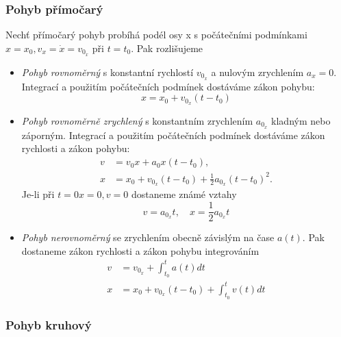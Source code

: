       \subsubsection{Pohyb přímočarý}
          Nechť přímočarý pohyb probíhá podél osy x s počátečními podmínkami $x = x_0,v_x =
          \dot{x}=v_{0_x}$ při $t = t_0$. Pak rozlišujeme
          \begin{itemize}
            \item \emph{Pohyb rovnoměrný} s konstantní rychlostí $v_{0_x}$ a nulovým zrychlením
                  $a_x=0$. Integrací a použitím počátečních podmínek dostáváme zákon pohybu:
                  \begin{equation}\label{mech:eq_primocar_rovnomer}
                    x=x_0+v_{0_x}(t-t_0)
                  \end{equation}
            \item \emph{Pohyb rovnoměrně zrychlený} s konstantním zrychlením $a_{0_x}$ kladným nebo
                  záporným. Integrací a použitím počátečních podmínek dostáváme zákon ry\-chlo\-sti a
                  zákon pohybu:
                  \begin{align}
                    v &= v_0x+a_0x(t-t_0), \\
                    x &= x_0+v_{0_x}(t-t_0)+\frac{1}{2}a_{0_x}(t-t_0)^2 \label{mech:eq_const_acc}.
                  \end{align}
                  Je-li při $t = 0 x = 0, v = 0$ dostaneme známé vztahy $$v=a_{0_x}t,\quad
                  x=\frac{1}{2}a_{0_x}t$$
            \item \emph{Pohyb nerovnoměrný} se zrychlením obecně závislým na čase $a(t)$. Pak
                  do\-sta\-ne\-me zákon rychlosti a zákon pohybu integrováním
                  \begin{align}
                    v &= v_{0_x}+\int_{t_0}^{t}{a(t)dt} \\
                    x &= x_0+v_{0_x}(t-t_0)+\int_{t_0}^{t}{v(t)dt}
                  \end{align}
          \end{itemize}
      \subsubsection{Pohyb kruhový}
